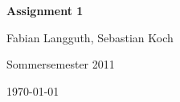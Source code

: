 



% 

\begin{center}
    \huge {\bf Assignment 1}
    
    \small Fabian Langguth, Sebastian Koch
    
    Sommersemester 2011
    
    \today
\end{center}



